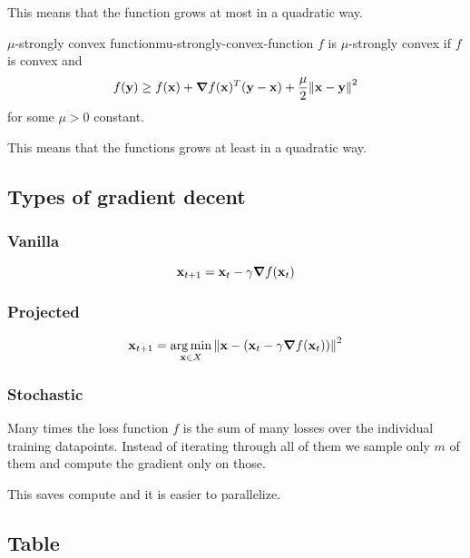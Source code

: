 \documentclass[12pt]{extarticle}
\renewcommand{\vec}[1]{\bvec{#1}}
\numberwithin{equation}{subsection}
\begin{document}
This means that the function grows at most in a quadratic way.

\begin{definition}{$\mu$-strongly convex function}{mu-strongly-convex-function}
	$f$ is $\mu$-strongly convex if $f$ is convex and
	\begin{equation}
		f(\vec y) \geq f(\vec x) + \grad f(\vec x)^T (\vec y - \vec x) + \frac{\mu}{2} \norm{\vec x - \vec y}^2
	\end{equation}
	for some $\mu > 0$ constant.
\end{definition}
This means that the functions grows at least in a quadratic way.

\subsection{Types of gradient decent}

\subsubsection{Vanilla}

\begin{equation}
	\vec x_{t+1} = \vec x_t - \gamma \grad f(\vec x_t)
\end{equation}

\subsubsection{Projected}

\begin{equation}
	\vec x_{t+1} = \argmin_{\vec x \in X}\norm{ \vec x - (\vec x_t - \gamma \grad f(\vec x_t)) }^2
\end{equation}

\subsubsection{Stochastic}

Many times the loss function $f$ is the sum of many losses over the individual training datapoints.
Instead of iterating through all of them we sample only $m$ of them and compute the gradient only on
those.

This saves compute and it is easier to parallelize.

\subsection{Table}
\end{document}
